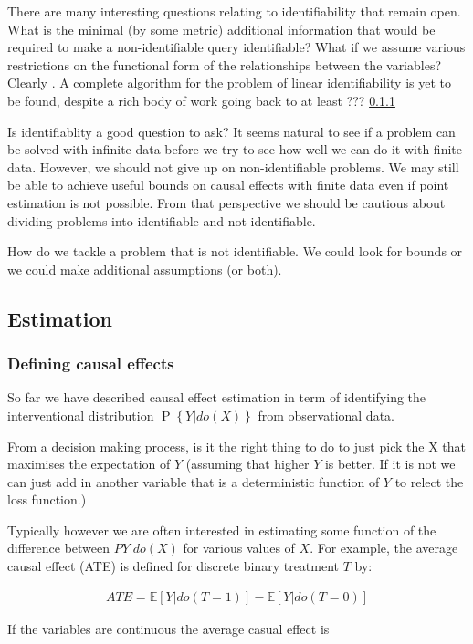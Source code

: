 \documentclass[11pt,a4paper,oneside]{book}
\newcommand{\E}[1]{\mathbb E\left[{#1}\right]}
\newcommand{\eqn}[1]{\begin{align}#1\end{align}}
\renewcommand{\P}[1]{\operatorname{P}\left\{#1\right\}}
\theoremstyle{plain}
\theoremstyle{definition}
\begin{document}

There are many interesting questions relating to identifiability that remain open. What is the minimal (by some metric) additional information that would be required to make a non-identifiable query identifiable? What if we assume various restrictions on the functional form of the relationships between the variables? Clearly  . A complete algorithm for the problem of linear identifiability is yet to be found, despite a rich body of work going back to at least ??? \ref{}

Is identifiablity a good question to ask? It seems natural to see if a problem can be solved with infinite data before we try to see how well we can do it with finite data. However, we should not give up on non-identifiable problems. We may still be able to achieve useful bounds on causal effects with finite data even if point estimation is not possible. From that perspective we should be cautious about dividing problems into identifiable and not identifiable. 

How do we tackle a problem that is not identifiable. We could look for bounds or we could make additional assumptions (or both). 

\subsection{Estimation}
\subsubsection{Defining causal effects} 
So far we have described causal effect estimation in term of identifying the interventional distribution $\P{Y|do(X)}$ from observational data. 

From a decision making process, is it the right thing to do to just pick the X that maximises the expectation of $Y$ (assuming that higher $Y$ is better. If it is not we can just add in another variable that is a deterministic function of $Y$ to relect the loss function.)

Typically however we are often interested in estimating some function of the difference between $P{Y|do(X)}$ for various values of $X$. For example, the average causal effect (ATE) is defined for discrete binary treatment $T$ by:

\eqn{
ATE = \E{Y|do(T = 1)} - \E{Y|do(T=0)}
}

If the variables are continuous the average casual effect is 
\end{document}
